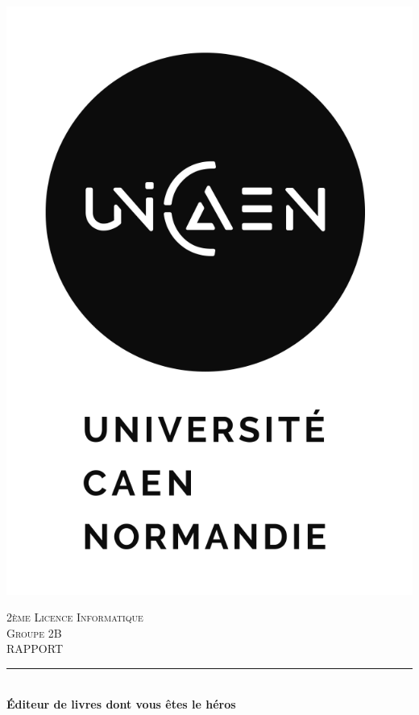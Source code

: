 \documentclass[12pt]{article}
\newcommand{\HRule}{\rule{\linewidth}{0.5mm}}
\begin{document}
	
\begin{titlepage}
  \begin{sffamily}
  \begin{center}
    
    \includegraphics[scale=0.5]{./images/unicaenLogo.png}

    \textsc{\LARGE 2ème Licence Informatique }\\[2cm]
    \textsc{\Large Groupe 2B }\\[1.5cm]

    \textsc{\Large RAPPORT }\\[1.5cm]

    \HRule \\[0.4cm]
    { \huge \bfseries Éditeur de livres dont vous êtes le héros\\[0.4cm] }


\end{center}
\end{sffamily}
\end{titlepage}
\end{document}
